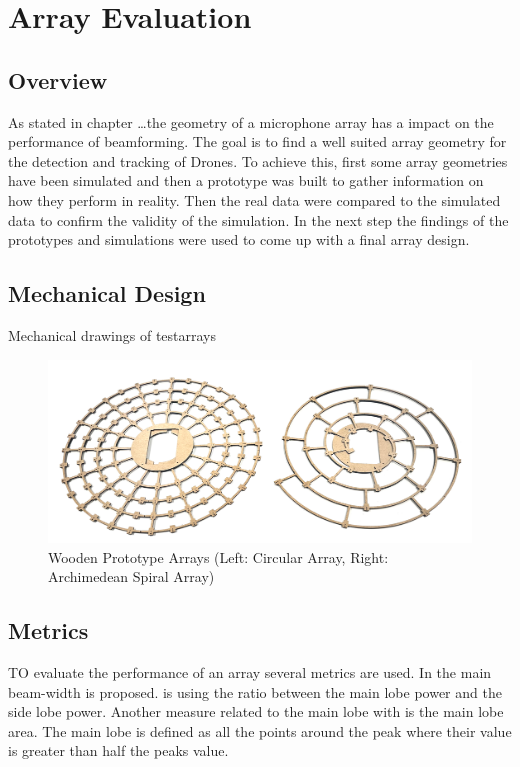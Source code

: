 \chapter{Array Evaluation}
\section{Overview}
As stated in chapter \dots the geometry of a microphone array
has a impact on the performance of beamforming.
The goal is to find a well suited array geometry for the detection and tracking of 
Drones.
To achieve this, first some array geometries have been simulated and then
a prototype was built to gather information on how they perform in reality.
Then the real data were compared to the simulated data to
confirm the validity of the simulation.
In the next step the findings of the prototypes and simulations 
were used to come up with a final array design.

\newpage
\section{Mechanical Design}
Mechanical drawings of testarrays

\begin{figure}[h]
	\centering
	\includegraphics[width=1.0\textwidth]{images/5_array_evaluation/wooden_arrays.png}
	\caption{Wooden Prototype Arrays (Left: Circular Array, Right: Archimedean Spiral Array)}
	\label{fig:wooden_arrays}
\end{figure}

\newpage
\section{Metrics}
TO evaluate the performance of an array several metrics are used.
In  the
main beam-width is proposed.
 is using the ratio
between the main lobe power and the side lobe power.
Another measure related to the main lobe with is the main lobe area.
The main lobe is defined as all the points around the peak where their value
is greater than half the peaks value. 

